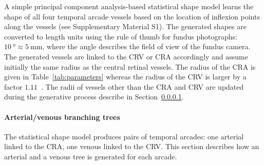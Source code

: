 \documentclass[11pt,]{article}
\begin{document}
A simple principal component analysis-based statistical shape model learns the shape of all four temporal arcade vessels based on the location of inflexion points along the vessels (see Supplementary Material S1).
The generated shapes are converted to length units using the rule of thumb for fundus photographs: $\SI{10}{\degree}\approx\SI{5}{\mm}$, where the angle describes the
field of view of the fundus camera. The generated vessels are linked
to the CRV or CRA accordingly and
assume initially the same radius as the central retinal vessels.
The radius of the CRA is given in Table~\ref{tab:parameters} whereas the radius of the CRV is larger by a factor $1.11$~\cite{Goldenberg2013}.
The radii of vessels other than the CRA and CRV are updated during the generative process describe in Section~\ref{sec:CCO}.

\paragraph{Arterial/venous branching trees}\label{sec:CCO}

The statistical shape model produces pairs of temporal arcades: one arterial linked to the CRA, one venous linked to the CRV.
This section describes how an arterial and a venous tree is generated for each arcade.
\end{document}
